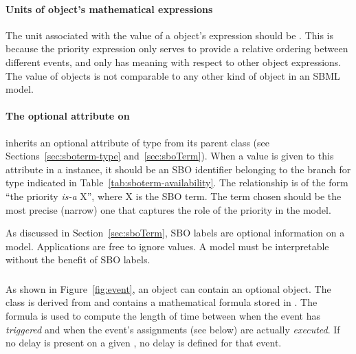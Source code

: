 \paragraph{Units of  object's mathematical
  expressions}

The unit associated with the value of a \Priority object's
 expression should be .  This is
because the priority expression only serves to provide a relative
ordering between different events, and only has meaning with
respect to other \Priority object expressions.  The value of
\Priority objects is not comparable to any other kind of object in
an SBML model.


\paragraph{The optional  attribute on }
\label{sec:priority-sboterm}

\Priority inherits an optional  attribute of type
 from its parent class \SBase (see
Sections~\ref{sec:sboterm-type} and~\ref{sec:sboTerm}).  When a
value is given to this attribute in a \Priority instance, it
should be an SBO identifier belonging to the branch for type
\Priority indicated in Table~\ref{tab:sboterm-availability}.  The
relationship is of the form ``the priority \emph{is-a} X'', where
X is the SBO term.  The term chosen should be the most precise
(narrow) one that captures the role of the priority in the model.

As discussed in Section~\ref{sec:sboTerm}, SBO labels are optional
information on a model.  Applications are free to ignore
 values.  A model must be interpretable without the
benefit of SBO labels.


\subsubsection{}
\label{sec:event-delay}

As shown in Figure~\ref{fig:event}, an \Event object can contain
an optional \Delay object.  The \Delay class is derived from
\SBase and contains a mathematical formula stored in .
The formula is used to compute the length of time between when the
event has \emph{triggered} and when the event's assignments (see
below) are actually \emph{executed}.  If no delay is present on a
given \Event, no delay is defined for that event.

